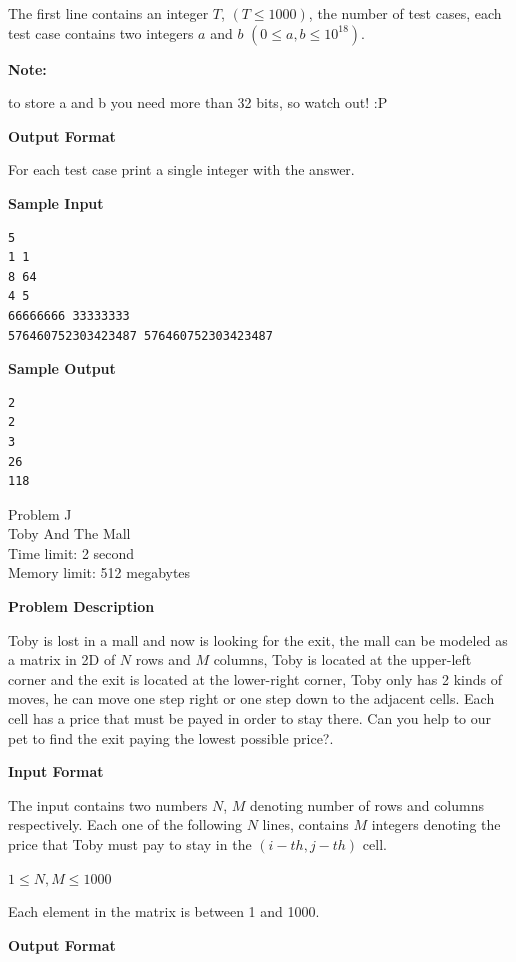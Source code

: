 \documentclass[11pt]{article}
\begin{document}
The first line contains an integer $T$, $(T \le 1000)$, the number of test cases,
each test case contains two integers $a$ and $b$ $(0 \le a,b \le 10^{18})$.

\textbf{\large Note:}

to store a and b you need more than 32 bits, so watch out! :P

\textbf{\large Output Format}

For each test case print a single integer with the answer.

\textbf{\large Sample Input}

\begin{verbatim}
5
1 1
8 64
4 5
66666666 33333333
576460752303423487 576460752303423487
\end{verbatim}

\textbf{\large Sample Output}

\begin{verbatim}
2
2
3
26
118
\end{verbatim}

\newpage

        \begin{center}
            {\LARGE Problem J}\\
            {\Large Toby And The Mall}\\
            {Time limit: 2 second}\\
            {Memory limit: 512 megabytes}
        \end{center}\textbf{\large Problem Description}

Toby is lost in a mall and now is looking for the exit, the mall can be modeled
as a matrix in 2D of $N$ rows and $M$ columns, Toby is located at the upper-left
corner and the exit is located at the lower-right corner, Toby only has 2
kinds of moves, he can move one step right or one step down to the adjacent
cells. Each cell has a price that must be payed in order to stay there.
Can you help to our pet to find the exit paying the lowest possible price?.

\textbf{\large Input Format}

The input contains two numbers $N$, $M$ denoting number of rows and columns respectively.
Each one of the following $N$ lines, contains $M$ integers denoting the price that
Toby must pay to stay in the $(i-th, j-th)$ cell.

$1 \le N, M \le 1000$

Each element in the matrix is between 1 and 1000.

\textbf{\large Output Format}
\end{document}

